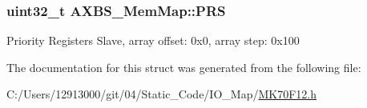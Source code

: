 \subsubsection[{P\+R\+S}]{\setlength{\rightskip}{0pt plus 5cm}uint32\+\_\+t A\+X\+B\+S\+\_\+\+Mem\+Map\+::\+P\+R\+S}\label{struct_a_x_b_s___mem_map_a840c4c5791c39bad3cfa7140aaab0a1f}
Priority Registers Slave, array offset\+: 0x0, array step\+: 0x100 

The documentation for this struct was generated from the following file\+:\begin{DoxyCompactItemize}
\item 
C\+:/\+Users/12913000/git/04/\+Static\+\_\+\+Code/\+I\+O\+\_\+\+Map/\hyperlink{_m_k70_f12_8h}{M\+K70\+F12.\+h}\end{DoxyCompactItemize}
